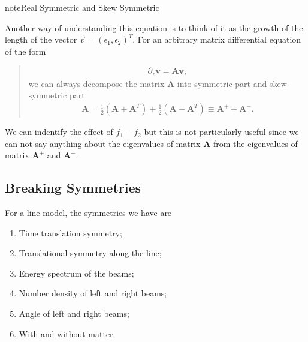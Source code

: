 \documentclass[letterpaper,12pt,english]{sphinxmanual}
\begin{document}
\begin{sphinxadmonition}{note}{Real Symmetric and Skew Symmetric}

Another way of understanding this equation is to think of it as the growth of the length of the vector \(\vec v = (\epsilon_1,\epsilon_2)^T\). For an arbitrary matrix differential equation of the form
\begin{quote}
\begin{equation*}
\begin{split}\partial_z \mathbf v = \mathbf A \mathbf v,\end{split}
\end{equation*}
we can always decompose the matrix \(\mathbf A\) into symmetric part and skew-symmetric part
\begin{equation*}
\begin{split}\mathbf A = \frac{1}{2}(\mathbf A + \mathbf A^T) + \frac{1}{2}(\mathbf A - \mathbf A^T) \equiv \mathbf A^+ + \mathbf A^-.\end{split}
\end{equation*}\end{quote}

We can indentify the effect of \(f_1-f_2\) but this is not particularly useful since we can not say anything about the eigenvalues of matrix \(\mathbf A\) from the eigenvalues of matrix \(\mathbf A^+\) and \(\mathbf A^-\).
\end{sphinxadmonition}


\subsection{Breaking Symmetries}
\label{\detokenize{collective/some-clarifications:breaking-symmetries}}
For a line model, the symmetries we have are
\begin{enumerate}
\item {} 
Time translation symmetry;

\item {} 
Translational symmetry along the line;

\item {} 
Energy spectrum of the beams; 

\item {} 
Number density of left and right beams;

\item {} 
Angle of left and right beams;

\item {} 
With and without matter.

\end{enumerate}
\end{document}
